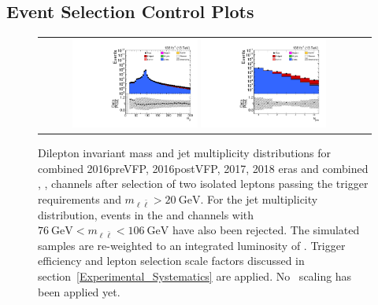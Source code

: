 \subsection{Event Selection Control Plots}
\begin{figure}[htb]
    \begin{center}
        \begin{tabular}{cc}
            \includegraphics[width=0.40\textwidth]{fig_fullRun2UL/controlplots/combined/DIMFull.pdf}
            \includegraphics[width=0.40\textwidth]{fig_fullRun2UL/controlplots/combined/HypjetMulti_diLep.pdf}
        \end{tabular}
        \caption{\footnotesize Dilepton invariant mass and jet multiplicity distributions for combined 2016preVFP, 2016postVFP, 2017, 2018 eras and combined \ee, \emu, \mumu channels after selection of two isolated leptons passing the trigger requirements and $m_{\ell\bar{\ell}} > \SI{20}{\GeV}$.
        For the jet multiplicity distribution, events in the \ee and \mumu channels with $\SI{76}{\GeV} < m_{\ell\bar{\ell}} < \SI{106}{\GeV}$ have also been rejected.
        The simulated samples are re-weighted to an integrated luminosity of \lumivalueRuniiUL.
        Trigger efficiency and lepton selection scale factors discussed in section~\ref{Experimental_Systematics} are applied.
        No \zjets\ scaling has been applied yet.
        }
    \end{center}
\end{figure}

